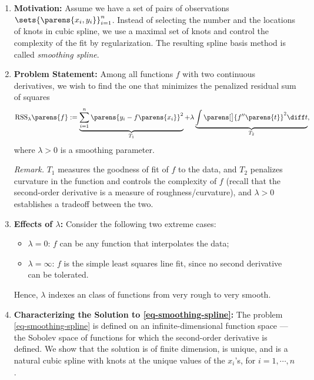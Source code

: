 \documentclass[12pt]{article}
\begin{document}
\begin{enumerate}[label=\textbf{\arabic*.}]

	\item \textbf{Motivation:} Assume we have a set of pairs of observations $\sets{\parens{x_i, y_i} }_{i=1}^n$. Instead of selecting the number and the locations of knots in cubic spline, we use a maximal set of knots and control the complexity of the fit by regularization. The resulting spline basis method is called \textit{smoothing spline}. 
	
	\item \textbf{Problem Statement:} Among all functions $f$ with two continuous derivatives, we wish to find the one that minimizes the penalized residual sum of squares
	\begin{align}\label{eq-smoothing-spline}
		\mathrm{RSS}_{\lambda} \parens{f} := \underbrace{\sum_{i=1}^n \parens{y_i - f \parens{x_i}}^2 }_{T_1} + \lambda \underbrace{ \int \parens[\big]{f''\parens{t}}^2 \diff t}_{T_2}, 
	\end{align}
	where $\lambda > 0$ is a smoothing parameter. 
	
	\textit{Remark.} $T_1$ measures the goodness of fit of $f$ to the data, and $T_2$ penalizes curvature in the function and controls the complexity of $f$ (recall that the second-order derivative is a measure of roughness/curvature), and $\lambda > 0$ establishes a tradeoff between the two. 
	
	\item \textbf{Effects of $\lambda$:} Consider the following two extreme cases: 
	\begin{itemize}
		\item $\lambda = 0$: $f$ can be any function that interpolates the data; 
		\item $\lambda = \infty$: $f$ is the simple least squares line fit, since no second derivative can be tolerated. 
	\end{itemize}
	Hence, $\lambda$ indexes an class of functions from very rough to very smooth. 
	
	\item \textbf{Characterizing the Solution to \eqref{eq-smoothing-spline}:} The problem \eqref{eq-smoothing-spline} is defined on an infinite-dimensional function space --- the Sobolev space of functions for which the second-order derivative is defined. We show that the solution is of finite dimension, is unique, and is a natural cubic spline with knots at the unique values of the $x_i$'s, for $ i = 1, \cdots, n$. 
	

\end{enumerate}
\end{document}
